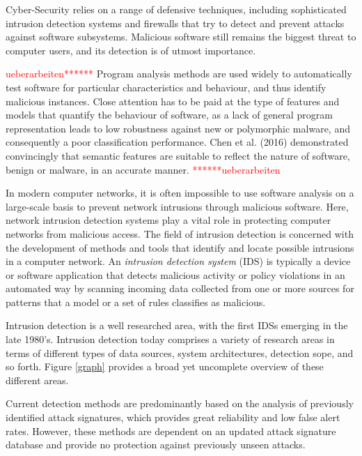 \documentclass[a4paper,12pt,twoside]{report}
\begin{document}
Cyber-Security relies on a range of defensive techniques, including sophisticated intrusion detection systems and firewalls that try to detect and prevent attacks against software subsystems. Malicious software still remains the biggest threat to computer users, and its detection is of utmost importance. 


\textcolor{red}{ueberarbeiten******}
Program analysis methods are used widely to automatically test software for particular characteristics and behaviour, and thus identify malicious instances. Close attention has to be paid at the type of features and models that quantify the behaviour of software, as a lack of general program representation leads to low robustness against new or polymorphic malware, and consequently a poor classification performance.  Chen et al.  (2016) \cite{chen2016robust, chen2016more} demonstrated convincingly that semantic features are suitable to reflect the nature of software, benign or malware, in an accurate manner. \textcolor{red}{******ueberarbeiten}

In modern computer networks, it is often impossible to use software analysis on a large-scale basis to prevent network intrusions through malicious software. Here, network intrusion detection systems play a vital role in protecting computer networks from malicious access. The field of intrusion detection is concerned with the development of methods and tools that identify and locate possible intrusions in a computer network. An \textit{intrusion detection system} (IDS) is typically a device or software application that detects malicious activity or policy violations in an automated way by scanning incoming data collected from one or more sources for patterns that a model or a set of rules classifies as malicious.

Intrusion detection is a well researched area, with the first IDSs emerging in the late 1980's. Intrusion detection today comprises a variety of research areas in terms of different types of data sources, system architectures, detection sope, and so forth. Figure \ref{graph} provides a broad yet uncomplete overview of these different areas. 



Current detection methods are predominantly based on the analysis of previously identified attack signatures, which provides great reliability and low false alert rates. However, these methods are dependent on an updated attack signature database and provide no protection against previously unseen attacks. 
\end{document}
